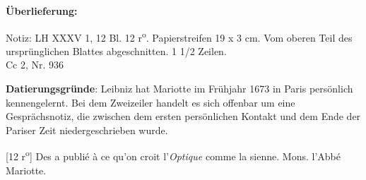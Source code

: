       
               
                \begin{ledgroupsized}[r]{120mm}
                \footnotesize 
                \pstart                
                \noindent\textbf{\"{U}berlieferung:}   
                \pend
                \end{ledgroupsized}
            
              
                            \begin{ledgroupsized}[r]{114mm}
                            \footnotesize 
                            \pstart \parindent -6mm
                            Notiz: LH XXXV 1, 12 Bl. 12 r\textsuperscript{o}. Papierstreifen 19 x 3 cm. Vom oberen Teil des urspr\"{u}nglichen Blattes abgeschnitten. 1 1/2 Zeilen.\\Cc 2, Nr. 936 \pend
                            \end{ledgroupsized}
                \vspace*{5mm}
                \begin{ledgroup}
                \footnotesize 
                \pstart
            \noindent\footnotesize{\textbf{Datierungsgr\"{u}nde}: Leibniz hat Mariotte im Fr\"{u}hjahr 1673 in Paris pers\"{o}nlich kennengelernt. Bei dem Zweizeiler handelt es sich offenbar um eine Gespr\"{a}chsnotiz, die zwischen dem ersten pers\"{o}nlichen Kontakt und dem Ende der Pariser Zeit niedergeschrieben wurde.}
                \pend
                \end{ledgroup}
            
                \vspace*{8mm}
                \pstart 
                \normalsize
            [12 r\textsuperscript{o}] Des \protect{} a publi\'{e} \`{a} ce qu'on croit l'\textit{Optique} \protect{} comme la  sienne. Mons. l'Abb\'{e} Mariotte\protect{}.\pend 
